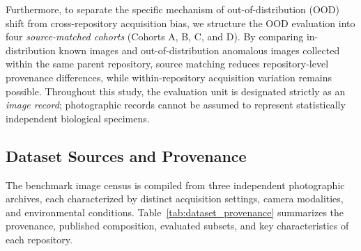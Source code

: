 Furthermore, to separate the specific mechanism of out-of-distribution (OOD) shift from cross-repository acquisition bias, we structure the OOD evaluation into four \textit{source-matched cohorts} (Cohorts A, B, C, and D). By comparing in-distribution known images and out-of-distribution anomalous images collected within the same parent repository, source matching reduces repository-level provenance differences, while within-repository acquisition variation remains possible. Throughout this study, the evaluation unit is designated strictly as an \textit{image record}; photographic records cannot be assumed to represent statistically independent biological specimens.

\subsection{Dataset Sources and Provenance}
\label{sec:dataset_sources_provenance}

The benchmark image census is compiled from three independent photographic archives, each characterized by distinct acquisition settings, camera modalities, and environmental conditions. Table~\ref{tab:dataset_provenance} summarizes the provenance, published composition, evaluated subsets, and key characteristics of each repository.

